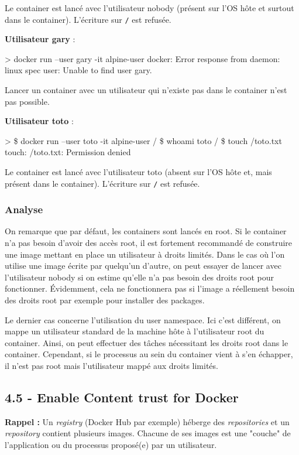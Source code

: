 \documentclass[11pt,a4paper,oneside]{report}
\newcommand{\code}[1]{\texttt{#1}}
\begin{document}
Le container est lancé avec l'utilisateur nobody (présent sur l'OS hôte et surtout dans le container). L'écriture sur \code{/} est refusée.


\textbf{Utilisateur gary} :
\begin{textcode}
> docker run --user gary -it alpine-user
docker: Error response from daemon: linux spec user: Unable to find user gary.
\end{textcode}

Lancer un container avec un utilisateur qui n'existe pas dans le container n'est pas possible.

\textbf{Utilisateur toto} :
\begin{textcode}
> \$ docker run --user toto -it alpine-user
/ \$ whoami
toto
/ \$ touch /toto.txt
touch: /toto.txt: Permission denied
\end{textcode}

Le container est lancé avec l'utilisateur toto (absent sur l'OS hôte et, mais présent dans le container). L'écriture sur \code{/} est refusée.

\subsubsection{Analyse}
On remarque que par défaut, les containers sont lancés en root. Si le container n'a pas besoin d'avoir des accès root, il est fortement recommandé de construire une image mettant en place un utilisateur à droits limités. Dans le cas où l'on utilise une image écrite par quelqu'un d'autre, on peut essayer de lancer avec l'utilisateur nobody si on estime qu'elle n'a pas besoin des droits root pour fonctionner. Évidemment, cela ne fonctionnera pas si l'image a réellement besoin des droits root par exemple pour installer des packages.

Le dernier cas concerne l'utilisation du user namespace. Ici c'est différent, on mappe un utilisateur standard de la machine hôte à l'utilisateur root du container. Ainsi, on peut effectuer des tâches nécessitant les droits root dans le container. Cependant, si le processus au sein du container vient à s'en échapper, il n'est pas root mais l'utilisateur mappé aux droits limités.


\subsection{4.5  - Enable Content trust for Docker}\label{ssc-content-trust}
\textbf{Rappel :} Un \textit{registry} (Docker Hub par exemple) héberge des \textit{repositories} et un \textit{repository} contient plusieurs images. Chacune de ses images est une "couche" de l'application ou du processus proposé(e) par un utilisateur.
\end{document}
